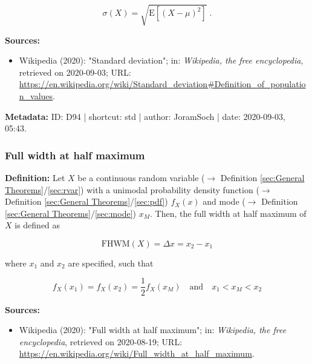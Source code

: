 \documentclass[a4paper,12pt,twoside]{book}
\begin{document}
\begin{equation} \label{eq:std-std}
\sigma(X) = \sqrt{\mathrm{E}\left[ (X-\mu)^2 \right]} \; .
\end{equation}


\vspace{1em}
\textbf{Sources:}
\begin{itemize}
\item Wikipedia (2020): "Standard deviation"; in: \textit{Wikipedia, the free encyclopedia}, retrieved on 2020-09-03; URL: \url{https://en.wikipedia.org/wiki/Standard_deviation#Definition_of_population_values}.
\end{itemize}


\vspace{1em}
\textbf{Metadata:} ID: D94 | shortcut: std | author: JoramSoch | date: 2020-09-03, 05:43.
\vspace{1em}



\subsubsection[\textit{Full width at half maximum}]{Full width at half maximum} \label{sec:fwhm}
\setcounter{equation}{0}

\textbf{Definition:} Let $X$ be a continuous random variable ($\rightarrow$ Definition \ref{sec:General Theorems}/\ref{sec:rvar}) with a unimodal probability density function ($\rightarrow$ Definition \ref{sec:General Theorems}/\ref{sec:pdf}) $f_X(x)$ and mode ($\rightarrow$ Definition \ref{sec:General Theorems}/\ref{sec:mode}) $x_M$. Then, the full width at half maximum of $X$ is defined as

\begin{equation} \label{eq:fwhm-FWHM}
\mathrm{FHWM}(X) = \Delta x = x_2 - x_1
\end{equation}

where $x_1$ and $x_2$ are specified, such that

\begin{equation} \label{eq:fwhm-x12}
f_X(x_1) = f_X(x_2) = \frac{1}{2} f_X(x_M) \quad \text{and} \quad x_1 < x_M < x_2
\end{equation}


\vspace{1em}
\textbf{Sources:}
\begin{itemize}
\item Wikipedia (2020): "Full width at half maximum"; in: \textit{Wikipedia, the free encyclopedia}, retrieved on 2020-08-19; URL: \url{https://en.wikipedia.org/wiki/Full_width_at_half_maximum}.
\end{itemize}
\end{document}
